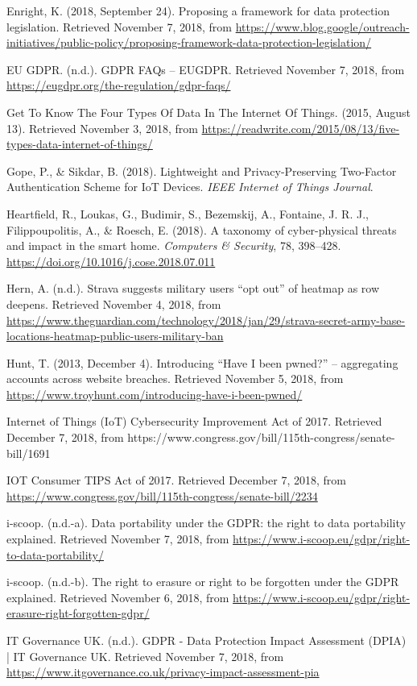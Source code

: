 \begin{hangparas}{2em}{1}
Enright, K. (2018, September 24). Proposing a framework for data protection legislation. Retrieved November 7, 2018, from \url{https://www.blog.google/outreach-initiatives/public-policy/proposing-framework-data-protection-legislation/}

EU GDPR. (n.d.). GDPR FAQs – EUGDPR. Retrieved November 7, 2018, from \url{https://eugdpr.org/the-regulation/gdpr-faqs/}

Get To Know The Four Types Of Data In The Internet Of Things. (2015, August 13). Retrieved November 3, 2018, from \url{https://readwrite.com/2015/08/13/five-types-data-internet-of-things/}

Gope, P., \& Sikdar, B. (2018). Lightweight and Privacy-Preserving Two-Factor Authentication Scheme for IoT Devices. \textit{IEEE Internet of Things Journal}.

Heartfield, R., Loukas, G., Budimir, S., Bezemskij, A., Fontaine, J. R. J., Filippoupolitis, A., \& Roesch, E. (2018). A taxonomy of cyber-physical threats and impact in the smart home. \textit{Computers \& Security}, 78, 398–428. \url{https://doi.org/10.1016/j.cose.2018.07.011}

Hern, A. (n.d.). Strava suggests military users “opt out” of heatmap as row deepens. Retrieved November 4, 2018, from \url{https://www.theguardian.com/technology/2018/jan/29/strava-secret-army-base-locations-heatmap-public-users-military-ban}

Hunt, T. (2013, December 4). Introducing “Have I been pwned?” – aggregating accounts across website breaches. Retrieved November 5, 2018, from \url{https://www.troyhunt.com/introducing-have-i-been-pwned/}

Internet of Things (IoT) Cybersecurity Improvement Act of 2017. Retrieved December 7, 2018, from https://www.congress.gov/bill/115th-congress/senate-bill/1691

IOT Consumer TIPS Act of 2017. Retrieved December 7, 2018, from \url{https://www.congress.gov/bill/115th-congress/senate-bill/2234}

i-scoop. (n.d.-a). Data portability under the GDPR: the right to data portability explained. Retrieved November 7, 2018, from \url{https://www.i-scoop.eu/gdpr/right-to-data-portability/}

i-scoop. (n.d.-b). The right to erasure or right to be forgotten under the GDPR explained. Retrieved November 6, 2018, from \url{https://www.i-scoop.eu/gdpr/right-erasure-right-forgotten-gdpr/}

IT Governance UK. (n.d.). GDPR - Data Protection Impact Assessment (DPIA) | IT Governance UK. Retrieved November 7, 2018, from \url{https://www.itgovernance.co.uk/privacy-impact-assessment-pia}


\end{hangparas}
